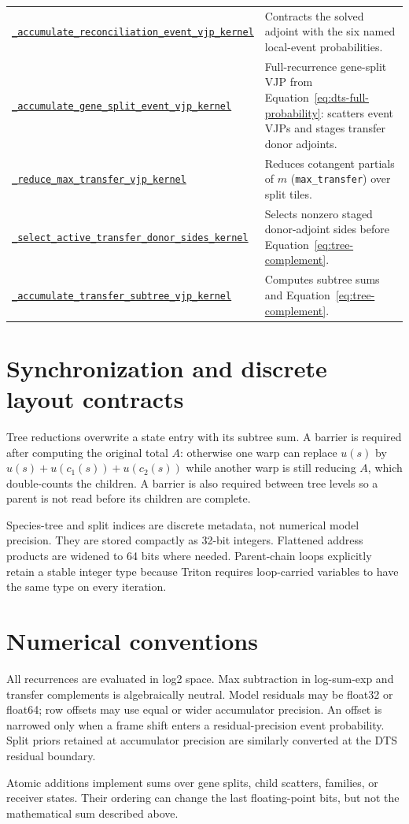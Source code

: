 \documentclass[11pt]{article}
\newcommand{\kernelref}[2]{\href{../../gpurec/core/kernels/#1}{\nolinkurl{#2}}}
\begin{document}
\begin{longtable}{>{\raggedright\arraybackslash}p{}
                  >{\raggedright\arraybackslash}p{}}
\kernelref{wave_backward_kernels.py}{_accumulate_reconciliation_event_vjp_kernel} & Contracts the solved adjoint with the six named local-event probabilities. \\
\kernelref{wave_backward_kernels.py}{_accumulate_gene_split_event_vjp_kernel} & Full-recurrence gene-split VJP from Equation~\eqref{eq:dts-full-probability}: scatters event VJPs and stages transfer donor adjoints. \\
\kernelref{wave_backward_kernels.py}{_reduce_max_transfer_vjp_kernel} & Reduces cotangent partials of $m$ (\texttt{max\_transfer}) over split tiles. \\
\kernelref{wave_backward_kernels.py}{_select_active_transfer_donor_sides_kernel} & Selects nonzero staged donor-adjoint sides before Equation~\eqref{eq:tree-complement}. \\
\kernelref{wave_backward_kernels.py}{_accumulate_transfer_subtree_vjp_kernel} & Computes subtree sums and Equation~\eqref{eq:tree-complement}. \\
\bottomrule
\end{longtable}
\normalsize

\section{Synchronization and discrete layout contracts}

Tree reductions overwrite a state entry with its subtree sum.  A barrier is
required after computing the original total $A$: otherwise one warp can replace
$u(s)$ by $u(s)+u(c_1(s))+u(c_2(s))$ while another warp is still reducing $A$,
which double-counts the children.  A barrier is also required between tree
levels so a parent is not read before its children are complete.

Species-tree and split indices are discrete metadata, not numerical model
precision.  They are stored compactly as 32-bit integers.  Flattened address
products are widened to 64 bits where needed.  Parent-chain loops explicitly
retain a stable integer type because Triton requires loop-carried variables to
have the same type on every iteration.

\section{Numerical conventions}

All recurrences are evaluated in log2 space.  Max subtraction in log-sum-exp
and transfer complements is algebraically neutral.  Model residuals may be
float32 or float64; row offsets may use equal or wider accumulator precision.
An offset is narrowed only when a frame shift enters a residual-precision event
probability.  Split priors retained at accumulator precision are similarly
converted at the DTS residual boundary.

Atomic additions implement sums over gene splits, child scatters, families,
or receiver states.  Their ordering can change the last floating-point bits,
but not the mathematical sum described above.
\end{document}
